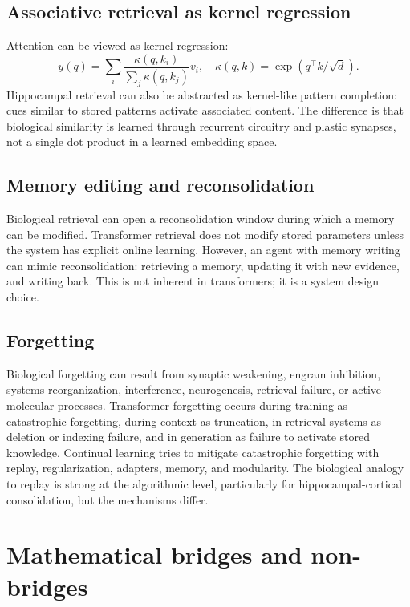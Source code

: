 \documentclass[11pt]{article}
\newcommand{\1}{\mathbf{1}}
\begin{document}
\subsection{Associative retrieval as kernel regression}

Attention can be viewed as kernel regression:
\[
y(q)=\sum_i \frac{\kappa(q,k_i)}{\sum_j\kappa(q,k_j)}v_i,
\quad \kappa(q,k)=\exp(q^\top k/\sqrt d).
\]
Hippocampal retrieval can also be abstracted as kernel-like pattern completion: cues similar to stored patterns activate associated content. The difference is that biological similarity is learned through recurrent circuitry and plastic synapses, not a single dot product in a learned embedding space.

\subsection{Memory editing and reconsolidation}

Biological retrieval can open a reconsolidation window during which a memory can be modified. Transformer retrieval does not modify stored parameters unless the system has explicit online learning. However, an agent with memory writing can mimic reconsolidation: retrieving a memory, updating it with new evidence, and writing back. This is not inherent in transformers; it is a system design choice.

\subsection{Forgetting}

Biological forgetting can result from synaptic weakening, engram inhibition, systems reorganization, interference, neurogenesis, retrieval failure, or active molecular processes. Transformer forgetting occurs during training as catastrophic forgetting, during context as truncation, in retrieval systems as deletion or indexing failure, and in generation as failure to activate stored knowledge. Continual learning tries to mitigate catastrophic forgetting with replay, regularization, adapters, memory, and modularity. The biological analogy to replay is strong at the algorithmic level, particularly for hippocampal-cortical consolidation, but the mechanisms differ.

\section{Mathematical bridges and non-bridges}
\end{document}
